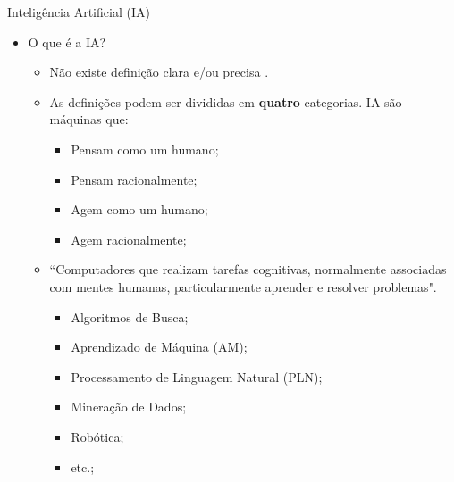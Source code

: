 \documentclass{libs/ufc_format}
\begin{document}
\begin{frame}{Inteligência Artificial (IA)}
    \begin{itemize}
        \justifying
        \item O que é a IA?
        \begin{itemize}
            \justifying
            \item<2-> Não existe definição clara e/ou precisa \cite{rn14, psrv19}.
            \item<3-> As definições podem ser divididas em \textbf{quatro} categorias. IA são máquinas que:
            \begin{itemize}
                \item<4> Pensam como um humano;
                \item<4> Pensam racionalmente;
                \item<4> Agem como um humano;
                \item<4> Agem racionalmente;
            \end{itemize}
            \item<5-> ``Computadores que realizam tarefas cognitivas, normalmente associadas com mentes humanas, particularmente aprender e resolver problemas". \cite{rmbg19}
            \begin{itemize}
                \item<6> Algoritmos de Busca;
                \item<6> Aprendizado de Máquina (AM);
                \item<6> Processamento de Linguagem Natural (PLN);
                \item<6> Mineração de Dados;
                \item<6> Robótica;
                \item<6> etc.; 
            \end{itemize}
        \end{itemize}
    \end{itemize}
\end{frame}
\end{document}
